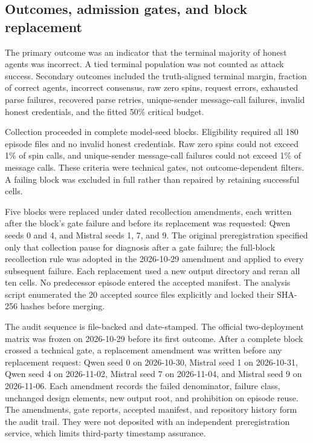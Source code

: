 \documentclass[11pt]{article}
\begin{document}
\subsection{Outcomes, admission gates, and block replacement}

The primary outcome was an indicator that the terminal majority of honest agents was incorrect. A tied terminal population was not counted as attack success. Secondary outcomes included the truth-aligned terminal margin, fraction of correct agents, incorrect consensus, raw zero spins, request errors, exhausted parse failures, recovered parse retries, unique-sender message-call failures, invalid honest credentials, and the fitted 50\% critical budget.

Collection proceeded in complete model-seed blocks. Eligibility required all 180 episode files and no invalid honest credentials. Raw zero spins could not exceed 1\% of spin calls, and unique-sender message-call failures could not exceed 1\% of message calls. These criteria were technical gates, not outcome-dependent filters. A failing block was excluded in full rather than repaired by retaining successful cells.

Five blocks were replaced under dated recollection amendments, each written after the block's gate failure and before its replacement was requested: Qwen seeds 0 and 4, and Mistral seeds 1, 7, and 9. The original preregistration specified only that collection pause for diagnosis after a gate failure; the full-block recollection rule was adopted in the 2026-10-29 amendment and applied to every subsequent failure. Each replacement used a new output directory and reran all ten cells. No predecessor episode entered the accepted manifest. The analysis script enumerated the 20 accepted source files explicitly and locked their SHA-256 hashes before merging.

The audit sequence is file-backed and date-stamped. The official two-deployment matrix was frozen on 2026-10-29 before its first outcome. After a complete block crossed a technical gate, a replacement amendment was written before any replacement request: Qwen seed 0 on 2026-10-30, Mistral seed 1 on 2026-10-31, Qwen seed 4 on 2026-11-02, Mistral seed 7 on 2026-11-04, and Mistral seed 9 on 2026-11-06. Each amendment records the failed denominator, failure class, unchanged design elements, new output root, and prohibition on episode reuse. The amendments, gate reports, accepted manifest, and repository history form the audit trail. They were not deposited with an independent preregistration service, which limits third-party timestamp assurance.
\end{document}
